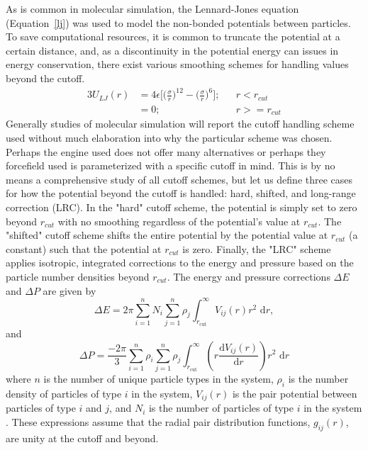 As is common in molecular simulation, the Lennard-Jones equation (Equation~\eqref{lj}) was used to model the non-bonded potentials between particles.
To save computational resources, it is common to truncate the potential at a certain distance, and, as a discontinuity in the potential energy can issues in energy conservation, there exist various smoothing schemes for handling values beyond the cutoff.
\begin{alignat}{3}
U_{LJ}(r) & = 4\epsilon\bigg[\bigg(\frac{\sigma}{r}\bigg)^{12} - \bigg(\frac{\sigma}{r}\bigg)^{6}\bigg]; && r<r_{cut} 
    \label{lj} \\
& = 0; && r>=r_{cut}
    \nonumber
\end{alignat}
Generally studies of molecular simulation will report the cutoff handling scheme used without much elaboration into why the particular scheme was chosen.
Perhaps the engine used does not offer many alternatives or perhaps they forcefield used is parameterized with a specific cutoff in mind.
This is by no means a comprehensive study of all cutoff schemes, but let us define three cases for how the potential beyond the cutoff is handled: hard, shifted, and long-range correction (LRC). 
In the "hard" cutoff scheme, the potential is simply set to zero beyond $r_{cut}$ with no smoothing regardless of the potential’s value at $r_{cut}$.
The "shifted" cutoff scheme shifts the entire potential by the potential value at $r_{cut}$ (a constant) such that the potential at $r_{cut}$ is zero.
Finally, the "LRC" scheme applies isotropic, integrated corrections to the energy and pressure based on the particle number densities beyond $r_{cut}$.
The energy and pressure corrections $\Delta E$ and $\Delta P$ are given by
\begin{equation}\label{lrc_e}
    \Delta E = 2\pi \sum_{i=1}^{n} N_i \sum_{j=1}^{n} \rho_j
    \int_{r_\mathrm{cut}}^{\infty} V_{ij}(r) r^2\,\,\mathrm{d}r, 
\end{equation}
and
\begin{equation}\label{lrc_p}
    \Delta P = \frac{-2\pi}{3} \sum_{i=1}^{n} \rho_i \sum_{j=1}^{n} \rho_j
    \int_{r_\mathrm{cut}}^{\infty} \left( r
    \frac{\mathrm{d}V_{ij}(r)}{\mathrm{d}r} \right) r^2 \,\,\mathrm{d}r  
\end{equation}
where $n$ is the number of unique particle types in the system, $\rho_{i}$ is the number density of particles of type $i$ in the system, $V_{ij}(r)$ is the pair potential between particles of type $i$ and $j$, and $N_{i}$ is the number of particles of type $i$ in the system \citep{frenkel2001understanding, Sun1998}.
These expressions assume that the radial pair distribution functions, $g_{ij}(r)$, are unity at the cutoff and beyond. 

